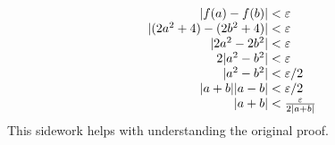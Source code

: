 \documentclass{article}
\begin{document}
\begin{sidework}

\begin{equation*}
\begin{gathered}
\begin{array}{r@{{}<{}}l}
|f(a)-f(b)|& \varepsilon \\
|(2a^2+4)-(2b^2+4)| &  \varepsilon \\
|2a^2-2b^2| & \varepsilon \\
2|a^2-b^2| & \varepsilon \\
|a^2-b^2| & \varepsilon/2 \\
|a + b||a - b|& \varepsilon/2 \\
|a + b| & \frac{\varepsilon}{2|a+b|}
\end{array}
\end{gathered}
\end{equation*}
This sidework helps with understanding the original proof.

\end{sidework}
\vspace{.25cm}
\end{document}
